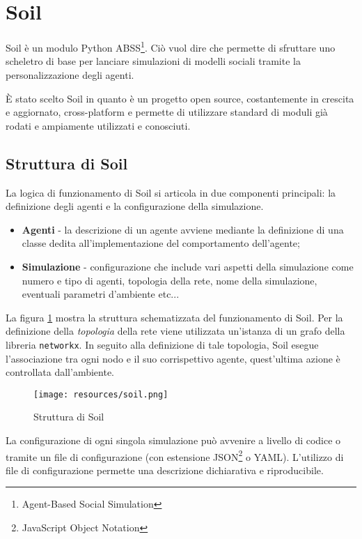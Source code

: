 \section{Soil}
    Soil è un modulo Python ABSS\footnote{Agent-Based Social Simulation}. Ciò vuol dire che permette di sfruttare uno scheletro di base per lanciare simulazioni di modelli sociali tramite la personalizzazione degli agenti.
    
    È stato scelto Soil in quanto è un progetto open source, costantemente in crescita e aggiornato, cross-platform e permette di utilizzare standard di moduli già rodati e ampiamente utilizzati e conosciuti.
    
    \subsection{Struttura di Soil}
        La logica di funzionamento di Soil si articola in due componenti principali: la definizione degli agenti e la configurazione della simulazione.
        
        \begin{itemize}
            \item \textbf{Agenti} - la descrizione di un agente avviene mediante la definizione di una classe dedita all'implementazione del comportamento dell'agente;
            \item \textbf{Simulazione} - configurazione che include vari aspetti della simulazione come numero e tipo di agenti, topologia della rete, nome della simulazione, eventuali parametri d'ambiente etc...
        \end{itemize}
        
        La figura \ref{fig:soil_structure} mostra la struttura schematizzata del funzionamento di Soil. Per la definizione della \textit{topologia} della rete viene utilizzata un'istanza di un grafo della libreria \texttt{networkx}. In seguito alla definizione di tale topologia, Soil esegue l'associazione tra ogni nodo e il suo corrispettivo agente, quest'ultima azione è controllata dall'ambiente.
        
        \begin{figure}[H]
            \centering
            \texttt{[image: resources/soil.png]}
            \caption{Struttura di Soil}
            \label{fig:soil_structure}
        \end{figure}
        
        La configurazione di ogni singola simulazione può avvenire a livello di codice o tramite un file di configurazione (con estensione JSON\footnote{JavaScript Object Notation} o YAML). L'utilizzo di file di configurazione permette una descrizione dichiarativa e riproducibile. 
        
